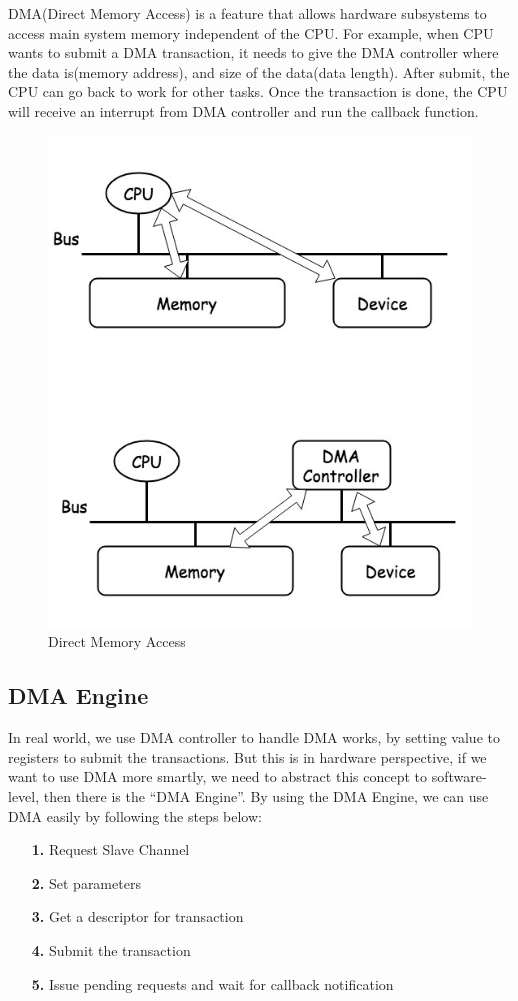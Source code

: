 DMA(Direct Memory Access) is a feature that allows hardware subsystems to access main system memory independent of the CPU. For example, when CPU wants to submit a DMA transaction, it needs to give the DMA controller where the data is(memory address), and size of the data(data length). After submit, the CPU can go back to work for other tasks. Once the transaction is done, the CPU will receive an interrupt from DMA controller and run the callback function.
\begin{figure}[!htb]
  \centering
  \includegraphics[scale=0.5]{images/DMA.jpg}
  \caption[Direct Memory Access]{Direct Memory Access}
  \label{fig:DMA}
\end{figure}
\newpage
\subsection{DMA Engine }
\label{subsec:DMA Engine}
In real world, we use DMA controller to handle DMA works, by setting value to registers to submit the transactions. But this is in hardware perspective, if we want to use DMA more smartly, we need to abstract this concept to software-level, then there is the ``DMA Engine''. By using the DMA Engine, we can use DMA easily by following the steps below:
\begin{itemize}
\setlength{\itemsep}{0pt}
\item[\textbf{1.}] Request Slave Channel
\item[\textbf{2.}] Set parameters 
\item[\textbf{3.}] Get a descriptor for transaction
\item[\textbf{4.}] Submit the transaction
\item[\textbf{5.}] Issue pending requests and wait for callback notification
\end{itemize}
